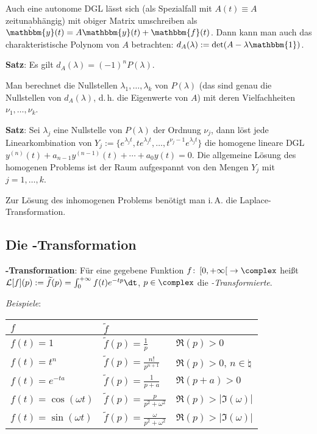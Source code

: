 Auch eine autonome DGL lässt sich (als Spezialfall mit $A(t) \equiv A$
zeitunabhängig) mit obiger Matrix umschreiben als
$\dot{\mathbbm{y}}(t) = A \mathbbm{y}(t) + \mathbbm{f}(t)$.
Dann kann man auch das charakteristische Polynom von $A$ betrachten:
$d_A(\lambda) := \det(A - \lambda \mathbbm{1})$.

\textbf{Satz}:
Es gilt $d_A(\lambda) = (-1)^n P(\lambda)$.

Man berechnet die Nullstellen $\lambda_1, \dotsc, \lambda_k$
von $P(\lambda)$ (das sind genau die Nullstellen
von $d_A(\lambda)$, d.\,h. die Eigenwerte von $A$)
mit deren Vielfachheiten $\nu_1, \dotsc, \nu_k$.

\textbf{Satz}:
Sei $\lambda_j$ eine Nullstelle von $P(\lambda)$ der Ordnung $\nu_j$,
dann löst jede Linearkombination von
$Y_j := \{e^{\lambda_j t}, t e^{\lambda_j t}, \dotsc,
t^{\nu_j - 1} e^{\lambda_j t}\}$ die homogene lineare DGL \\
$y^{(n)}(t) + a_{n-1} y^{(n-1)}(t) + \dotsb + a_0 y(t) = 0$.
Die allgemeine Lösung des homogenen Problems ist der Raum aufgespannt von
den Mengen $Y_j$ mit $j = 1, \dotsc, k$.

Zur Lösung des inhomogenen Problems benötigt man i.\,A.
die Laplace-Transformation.

\pagebreak

\subsection{%
    Die -Transformation%
}

\textbf{-Transformation}:
Für eine gegebene Funktion
$f\colon \left[0, +\infty\right[ \rightarrow \complex$ heißt \\
$\L[f](p) := \widetilde{f}(p) = \int_0^{+\infty} f(t) e^{-tp} \dt$,
$p \in \complex$ die \emph{-Transformierte}.

\emph{Beispiele}: \\
\begin{tabular}{l|ll}
    $f$ & $\widetilde{f}$ & \\\hline
    $f(t) = 1$ & $\widetilde{f}(p) = \frac{1}{p}$ & $\Re(p) > 0$ \\
    $f(t) = t^n$ & $\widetilde{f}(p) = \frac{n!}{p^{n+1}}$ &
    $\Re(p) > 0$, $n \in \natural$ \\
    $f(t) = e^{-ta}$ & $\widetilde{f}(p) = \frac{1}{p+a}$ & $\Re(p + a) > 0$ \\
    $f(t) = \cos(\omega t)$ &
    $\widetilde{f}(p) = \frac{p}{p^2 + \omega^2}$ &
    $\Re(p) > |\Im(\omega)|$ \\
    $f(t) = \sin(\omega t)$ &
    $\widetilde{f}(p) = \frac{\omega}{p^2 + \omega^2}$ &
    $\Re(p) > |\Im(\omega)|$ \\
\end{tabular}

